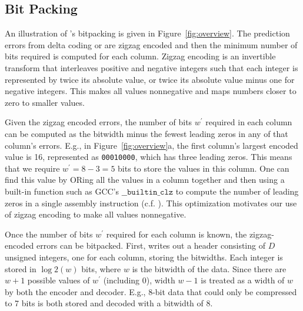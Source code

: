 

\subsection{Bit Packing} \label{sec:bitpacking}

An illustration of \mine's bitpacking is given in Figure~\ref{fig:overview}. The prediction errors from delta coding or \fire are zigzag encoded \cite{zigzag} and then the minimum number of bits required is computed for each column. Zigzag encoding is an invertible transform that interleaves positive and negative integers such that each integer is represented by twice its absolute value, or twice its absolute value minus one for negative integers. This makes all values nonnegative and maps numbers closer to zero to smaller values.

Given the zigzag encoded errors, the number of bits $w^\prime$ required in each column can be computed as the bitwidth minus the fewest leading zeros in any of that column's errors. E.g., in Figure~\ref{fig:overview}a, the first column's largest encoded value is 16, represented as \texttt{00010000}, which has three leading zeros. This means that we require $w^\prime = 8 - 3 = 5$ bits to store the values in this column. One can find this value by ORing all the values in a column together and then using a built-in function such as GCC's $\texttt{\_\_builtin\_clz}$ to compute the number of leading zeros in a single assembly instruction (c.f. \cite{fastpfor}). This optimization motivates our use of zigzag encoding to make all values nonnegative.

Once the number of bits $w^\prime$ required for each column is known, the zigzag-encoded errors can be bitpacked. First, \minesp writes out a header consisting of $D$ unsigned integers, one for each column, storing the bitwidths. Each integer is stored in $\log2(w)$ bits, where $w$ is the bitwidth of the data. Since there are $w+1$ possible values of $w^\prime$ (including 0), width $w-1$ is treated as a width of $w$ by both the encoder and decoder. E.g., 8-bit data that could only be compressed to 7 bits is both stored and decoded with a bitwidth of 8.

